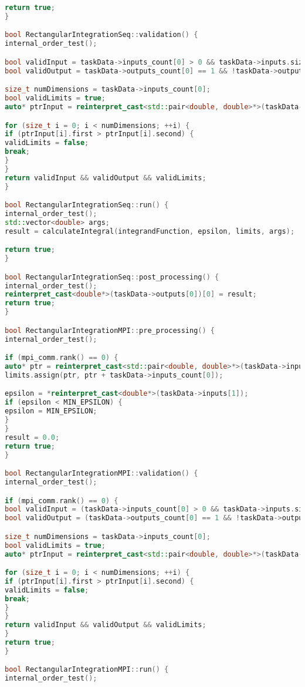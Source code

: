 \documentclass[12pt]{article}
\begin{document}
\begin{lstlisting}[language=C++]
return true;
}

bool RectangularIntegrationSeq::validation() {
internal_order_test();

bool validInput = taskData->inputs_count[0] > 0 && taskData->inputs.size() == 2;
bool validOutput = taskData->outputs_count[0] == 1 && !taskData->outputs.empty();

size_t numDimensions = taskData->inputs_count[0];
bool validLimits = true;
auto* ptrInput = reinterpret_cast<std::pair<double, double>*>(taskData->inputs[0]);

for (size_t i = 0; i < numDimensions; ++i) {
if (ptrInput[i].first > ptrInput[i].second) {
validLimits = false;
break;
}
}
return validInput && validOutput && validLimits;
}

bool RectangularIntegrationSeq::run() {
internal_order_test();
std::vector<double> args;
result = calculateIntegral(integrandFunction, epsilon, limits, args);

return true;
}

bool RectangularIntegrationSeq::post_processing() {
internal_order_test();
reinterpret_cast<double*>(taskData->outputs[0])[0] = result;
return true;
}

bool RectangularIntegrationMPI::pre_processing() {
internal_order_test();

if (mpi_comm.rank() == 0) {
auto* ptr = reinterpret_cast<std::pair<double, double>*>(taskData->inputs[0]);
limits.assign(ptr, ptr + taskData->inputs_count[0]);

epsilon = *reinterpret_cast<double*>(taskData->inputs[1]);
if (epsilon < MIN_EPSILON) {
epsilon = MIN_EPSILON;
}
}
result = 0.0;
return true;
}

bool RectangularIntegrationMPI::validation() {
internal_order_test();

if (mpi_comm.rank() == 0) {
bool validInput = (taskData->inputs_count[0] > 0 && taskData->inputs.size() == 2);
bool validOutput = (taskData->outputs_count[0] == 1 && !taskData->outputs.empty());

size_t numDimensions = taskData->inputs_count[0];
bool validLimits = true;
auto* ptrInput = reinterpret_cast<std::pair<double, double>*>(taskData->inputs[0]);

for (size_t i = 0; i < numDimensions; ++i) {
if (ptrInput[i].first > ptrInput[i].second) {
validLimits = false;
break;
}
}
return validInput && validOutput && validLimits;
}
return true;
}

bool RectangularIntegrationMPI::run() {
internal_order_test();


\end{lstlisting}
\end{document}
